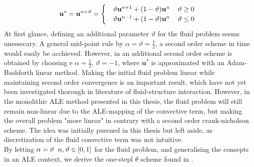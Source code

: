 \begin{align*}
\mathbf{u}^{*} =   \mathbf{u}^{n+ \vartheta} =
\begin{cases} 
   &\vartheta \mathbf{u}^{n+1} + (1 - \vartheta)\mathbf{u}^{n} \hspace{4mm} \vartheta \geq 0 \\ 
   &\vartheta \mathbf{u}^{n-1} + (1 - \vartheta)\mathbf{u}^{n} \hspace{4mm} \vartheta \leq 0
   \end{cases}
\end{align*}
At first glance, defining an additional parameter $\vartheta$ for the fluid problem seems unessecary. A general mid-point rule by  $\alpha = \vartheta = \frac{1}{2}$, a second order scheme in time would easily be acchieved. However, in \cite{Simo1994} an additional second order scheme is obtained by choosing e $\alpha = \frac{1}{2}$,  $\vartheta =-1$, where  $\mathbf{u}^{*}$ is approximated with an Adam-Bashforth linear method. Making the initial fluid problem linear while maintaining second order convergence is an important result, which have not yet been investigated thorough in literature of fluid-structure interaction.  However, in the monolithic  ALE method presented in this thesis, the fluid problem will still remain non-linear due to the ALE-mapping of the convective term, but making the overall problem "more linear" in contrary with a second order crank-nicholson scheme. The idea was initially pursued in this thesis but left aside, as discretization of the fluid convective term was not intuitive.  \\

By letting $\alpha = \vartheta \hspace{2mm} \alpha, \vartheta \in [0, 1] $ for the fluid problem, and generalising the consepts in an ALE context, we derive the one-stepl $\theta$ scheme found in \cite{Wicka}.

